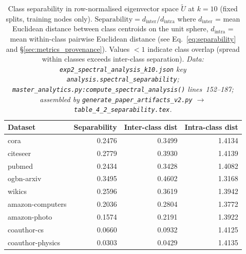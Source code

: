 \documentclass[11pt]{article}
\begin{document}
\begin{table}[H]
\centering\small\setlength{\tabcolsep}{6pt}
\caption{Class separability in row-normalised eigenvector space $\tilde{U}$ at $k{=}10$
(fixed splits, training nodes only).
$\mathrm{Separability} = d_{\mathrm{inter}} / d_{\mathrm{intra}}$
where $d_{\mathrm{inter}}$ = mean Euclidean distance between class centroids on the unit sphere,
$d_{\mathrm{intra}}$ = mean within-class pairwise Euclidean distance
(see Eq.~\ref{eq:separability} and \S\ref{sec:metrics_provenance}).
Values $<1$ indicate class overlap (spread within classes exceeds inter-class separation).
\textit{\scriptsize Data: \texttt{exp2\_spectral\_analysis\_k10.json} key \texttt{analysis.spectral\_separability};
\texttt{master\_analytics.py:compute\_spectral\_analysis()} lines~152--187;
assembled by \texttt{generate\_paper\_artifacts\_v2.py} $\to$ \texttt{table\_4\_2\_separability.tex}.}}
\label{tab:separability}
\begin{tabular}{lrrr}
\toprule
Dataset & Separability & Inter-class dist & Intra-class dist \\
\midrule
cora             & 0.2476 & 0.3499 & 1.4134 \\
citeseer         & 0.2779 & 0.3930 & 1.4139 \\
pubmed           & 0.2434 & 0.3428 & 1.4082 \\
ogbn-arxiv       & 0.3495 & 0.4602 & 1.3168 \\
wikics           & 0.2596 & 0.3619 & 1.3942 \\
amazon-computers & 0.2036 & 0.2804 & 1.3772 \\
amazon-photo     & 0.1574 & 0.2191 & 1.3922 \\
coauthor-cs      & 0.0660 & 0.0932 & 1.4125 \\
coauthor-physics & 0.0303 & 0.0429 & 1.4135 \\
\bottomrule
\end{tabular}
\end{table}
\end{document}
